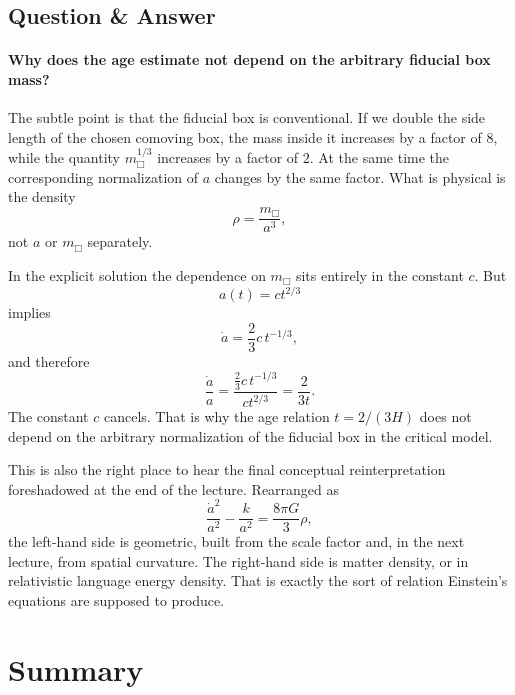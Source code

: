 \subsection{Question \& Answer}

\paragraph{Why does the age estimate not depend on the arbitrary fiducial box mass?}
The subtle point is that the fiducial box is conventional. If we double the side length of the chosen comoving box, the mass inside it increases by a factor of \(8\), while the quantity \(m_{\Box}^{1/3}\) increases by a factor of \(2\). At the same time the corresponding normalization of \(a\) changes by the same factor. What is physical is the density
\begin{equation}
\rho=\frac{m_{\Box}}{a^3},
\end{equation}
not \(a\) or \(m_{\Box}\) separately.

In the explicit solution the dependence on \(m_{\Box}\) sits entirely in the constant \(c\). But
\begin{equation}
a(t)=ct^{2/3}
\end{equation}
implies
\begin{equation}
\dot a = \frac{2}{3}c\,t^{-1/3},
\end{equation}
and therefore
\begin{equation}
\frac{\dot a}{a}=\frac{\frac{2}{3}c\,t^{-1/3}}{ct^{2/3}}=\frac{2}{3t}.
\end{equation}
The constant \(c\) cancels. That is why the age relation \(t=2/(3H)\) does not depend on the arbitrary normalization of the fiducial box in the critical model.

This is also the right place to hear the final conceptual reinterpretation foreshadowed at the end of the lecture. Rearranged as
\begin{equation}
\frac{\dot a^2}{a^2}-\frac{k}{a^2}=\frac{8\pi G}{3}\rho,
\end{equation}
the left-hand side is geometric, built from the scale factor and, in the next lecture, from spatial curvature. The right-hand side is matter density, or in relativistic language energy density. That is exactly the sort of relation Einstein's equations are supposed to produce.

\section{Summary}

